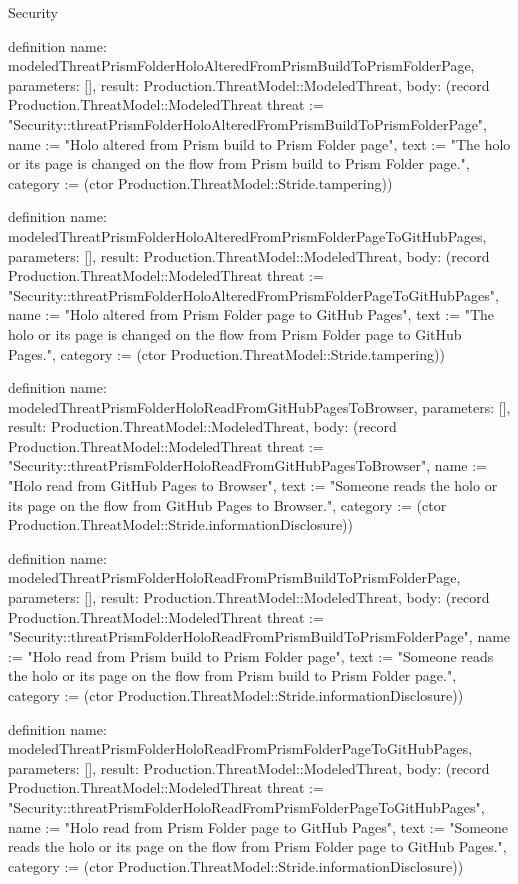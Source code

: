 \begin{lexlean}{Security}
\begin{semanticmodule}
definition{
  name: modeledThreatPrismFolderHoloAlteredFromPrismBuildToPrismFolderPage,
  parameters: [],
  result: Production.ThreatModel::ModeledThreat,
  body: (record Production.ThreatModel::ModeledThreat {threat := "Security::threatPrismFolderHoloAlteredFromPrismBuildToPrismFolderPage", name := "Holo altered from Prism build to Prism Folder page", text := "The holo or its page is changed on the flow from Prism build to Prism Folder page.", category := (ctor Production.ThreatModel::Stride.tampering)})
}

definition{
  name: modeledThreatPrismFolderHoloAlteredFromPrismFolderPageToGitHubPages,
  parameters: [],
  result: Production.ThreatModel::ModeledThreat,
  body: (record Production.ThreatModel::ModeledThreat {threat := "Security::threatPrismFolderHoloAlteredFromPrismFolderPageToGitHubPages", name := "Holo altered from Prism Folder page to GitHub Pages", text := "The holo or its page is changed on the flow from Prism Folder page to GitHub Pages.", category := (ctor Production.ThreatModel::Stride.tampering)})
}

definition{
  name: modeledThreatPrismFolderHoloReadFromGitHubPagesToBrowser,
  parameters: [],
  result: Production.ThreatModel::ModeledThreat,
  body: (record Production.ThreatModel::ModeledThreat {threat := "Security::threatPrismFolderHoloReadFromGitHubPagesToBrowser", name := "Holo read from GitHub Pages to Browser", text := "Someone reads the holo or its page on the flow from GitHub Pages to Browser.", category := (ctor Production.ThreatModel::Stride.informationDisclosure)})
}

definition{
  name: modeledThreatPrismFolderHoloReadFromPrismBuildToPrismFolderPage,
  parameters: [],
  result: Production.ThreatModel::ModeledThreat,
  body: (record Production.ThreatModel::ModeledThreat {threat := "Security::threatPrismFolderHoloReadFromPrismBuildToPrismFolderPage", name := "Holo read from Prism build to Prism Folder page", text := "Someone reads the holo or its page on the flow from Prism build to Prism Folder page.", category := (ctor Production.ThreatModel::Stride.informationDisclosure)})
}

definition{
  name: modeledThreatPrismFolderHoloReadFromPrismFolderPageToGitHubPages,
  parameters: [],
  result: Production.ThreatModel::ModeledThreat,
  body: (record Production.ThreatModel::ModeledThreat {threat := "Security::threatPrismFolderHoloReadFromPrismFolderPageToGitHubPages", name := "Holo read from Prism Folder page to GitHub Pages", text := "Someone reads the holo or its page on the flow from Prism Folder page to GitHub Pages.", category := (ctor Production.ThreatModel::Stride.informationDisclosure)})
}


\end{semanticmodule}
\end{lexlean}
